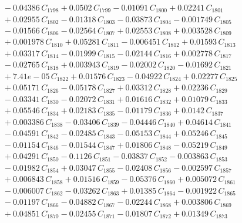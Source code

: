 \documentclass[a4paper,11pt]{article}
\begin{document}
\begin{align}
&\quad - 0.04386\,C_{1798} + 0.0502\,C_{1799} - 0.01091\,C_{1800} + 0.02241\,C_{1801} \nonumber\\
&\quad + 0.02955\,C_{1802} - 0.01318\,C_{1803} - 0.03873\,C_{1804} - 0.001749\,C_{1805} \nonumber\\
&\quad - 0.01566\,C_{1806} - 0.02564\,C_{1807} + 0.02553\,C_{1808} + 0.003528\,C_{1809} \nonumber\\
&\quad + 0.001978\,C_{1810} + 0.05281\,C_{1811} - 0.006451\,C_{1812} + 0.01593\,C_{1813} \nonumber\\
&\quad + 0.03317\,C_{1814} - 0.01999\,C_{1815} - 0.02144\,C_{1816} + 0.002778\,C_{1817} \nonumber\\
&\quad - 0.02765\,C_{1818} + 0.003943\,C_{1819} - 0.02002\,C_{1820} - 0.01692\,C_{1821} \nonumber\\
&\quad + 7.41e-05\,C_{1822} + 0.01576\,C_{1823} - 0.04922\,C_{1824} + 0.02277\,C_{1825} \nonumber\\
&\quad + 0.05171\,C_{1826} - 0.05178\,C_{1827} + 0.03312\,C_{1828} + 0.02236\,C_{1829} \nonumber\\
&\quad - 0.03341\,C_{1830} - 0.02072\,C_{1831} + 0.01616\,C_{1832} + 0.01079\,C_{1833} \nonumber\\
&\quad + 0.05546\,C_{1834} + 0.02183\,C_{1835} - 0.01179\,C_{1836} + 0.0142\,C_{1837} \nonumber\\
&\quad + 0.003386\,C_{1838} - 0.03406\,C_{1839} - 0.04446\,C_{1840} + 0.04614\,C_{1841} \nonumber\\
&\quad - 0.04591\,C_{1842} - 0.02485\,C_{1843} - 0.05153\,C_{1844} + 0.05246\,C_{1845} \nonumber\\
&\quad - 0.01154\,C_{1846} - 0.01544\,C_{1847} + 0.01806\,C_{1848} - 0.05219\,C_{1849} \nonumber\\
&\quad + 0.04291\,C_{1850} - 0.1126\,C_{1851} - 0.03837\,C_{1852} - 0.003863\,C_{1853} \nonumber\\
&\quad - 0.01982\,C_{1854} + 0.03047\,C_{1855} - 0.02408\,C_{1856} - 0.002597\,C_{1857} \nonumber\\
&\quad + 0.006843\,C_{1858} + 0.01516\,C_{1859} - 0.05376\,C_{1860} + 0.005072\,C_{1861} \nonumber\\
&\quad - 0.006007\,C_{1862} - 0.03262\,C_{1863} + 0.01385\,C_{1864} - 0.001922\,C_{1865} \nonumber\\
&\quad - 0.01197\,C_{1866} - 0.04882\,C_{1867} - 0.02244\,C_{1868} + 0.003806\,C_{1869} \nonumber\\
&\quad + 0.04851\,C_{1870} - 0.02455\,C_{1871} - 0.01807\,C_{1872} + 0.01349\,C_{1873} \nonumber\\

\end{align}
\end{document}
